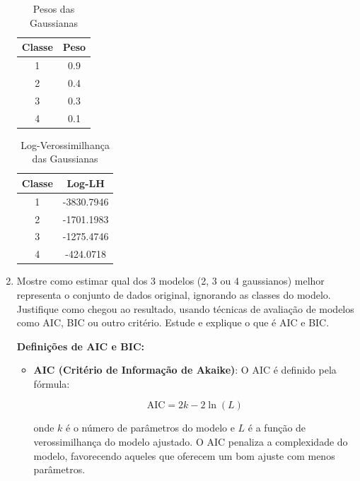 \begin{enumerate}
\begin{table}[H]
    \centering
    \caption{Pesos das Gaussianas}
    \begin{tabular}{|c|c|}
        \hline
        Classe & Peso \\ \hline
        1 & 0.9 \\ \hline
        2 & 0.4 \\ \hline
        3 & 0.3 \\ \hline
        4 & 0.1 \\ \hline
    \end{tabular}
    \label{tab:weights_2}
\end{table}

\begin{table}[H]
    \centering
    \caption{Log-Verossimilhança das Gaussianas}
    \begin{tabular}{|c|c|}
        \hline
        Classe & Log-LH \\ \hline
        1 & -3830.7946 \\ \hline
        2 & -1701.1983 \\ \hline
        3 & -1275.4746 \\ \hline
        4 & -424.0718 \\ \hline
    \end{tabular}
    \label{tab:log-likelihood_2}
\end{table}

\newpage

\item Mostre como estimar qual dos 3 modelos (2, 3 ou 4 gaussianos) melhor representa o conjunto de dados original, ignorando as classes do modelo. Justifique como chegou ao resultado, usando técnicas de avaliação de modelos como AIC, BIC ou outro critério. Estude e explique o que é AIC e BIC.

\begin{tcolorbox}[colback=white, colframe=black, title=Resposta:]
    \textbf{Definições de AIC e BIC:} 
    
    \begin{itemize}
        \item \textbf{AIC (Critério de Informação de Akaike)}: O AIC é definido pela fórmula:
    
        \[
        \text{AIC} = 2k - 2\ln(L)
        \]
    
        onde \(k\) é o número de parâmetros do modelo e \(L\) é a função de verossimilhança do modelo ajustado. O AIC penaliza a complexidade do modelo, favorecendo aqueles que oferecem um bom ajuste com menos parâmetros.
    

\end{itemize}
\end{tcolorbox}
\end{enumerate}
